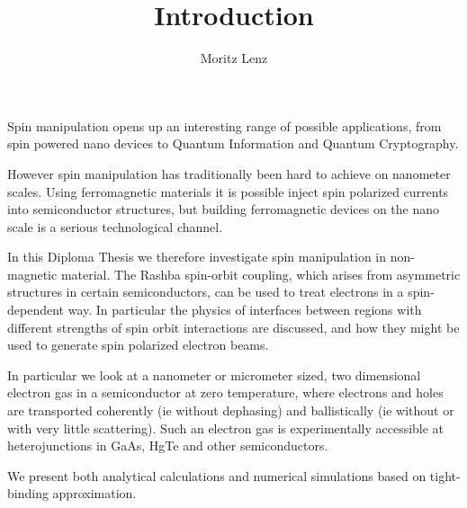 \documentclass[11pt]{article}
\author{Moritz Lenz}
\title{Introduction}
\begin{document}
\maketitle

Spin manipulation opens up an interesting range of possible applications, from
spin powered nano devices to Quantum Information and Quantum Cryptography.

However spin manipulation has traditionally been hard to achieve on nanometer
scales. Using ferromagnetic materials it is possible inject spin polarized
currents into semiconductor structures, but building ferromagnetic devices on
the nano scale is a serious technological channel.

In this Diploma Thesis we therefore investigate spin manipulation in
non-magnetic material. The Rashba spin-orbit coupling, which arises from
asymmetric structures in certain semiconductors, can be used to treat
electrons in a spin-dependent way. In particular the physics of interfaces
between regions with different strengths of spin orbit interactions are
discussed, and how they might be used to generate spin polarized electron
beams.

In particular we look at a nanometer or micrometer sized, two dimensional
electron gas in a semiconductor at zero temperature, where electrons and holes
are transported coherently (ie without dephasing) and ballistically (ie
without or with very little scattering). Such an electron gas is
experimentally accessible at heterojunctions in GaAs, HgTe and other semiconductors.

We present both analytical calculations and numerical simulations based on
tight-binding approximation.
\end{document}
